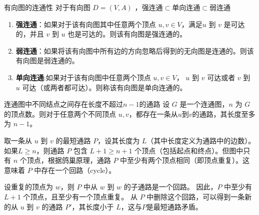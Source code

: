 \documentclass[lang=cn,11pt]{elegantbook}
\begin{document}
\begin{definition}{有向图的连通性}
对于有向图 $D = (V, A)$ ，$\text{强连通} \subset \text{单向连通} \subset \text{弱连通}$
\begin{enumerate}
    \item \textbf{强连通}：如果对于该有向图其中任意两个顶点 $u, v \in V$，满足$u$ 到 $v$ 是可达的，并且 $v$ 到 $u$ 也是可达的。则该有向图是强连通的。
\item\textbf{弱连通}：如果将该有向图中所有边的方向忽略后得到的无向图是连通的。则该有向图是弱连通的。
\item\textbf{单向连通}:如果对于该有向图中任意两个顶点 $u, v \in V$， $u$ 到 $v$ 可达或者 $v$ 到 $u$ 可达（或两者都可达）。则称该有向图是单向连通的。
\end{enumerate}
\end{definition}
\begin{theorem}{连通图中不同结点之间存在长度不超过$n-1$的通路}
    设 $G$ 是一个连通图，$n$ 为 $G$ 的顶点数。则对于任意两个不同顶点 $u, v$，都存在一条从$u$到$v$的通路，其长度至多为 $n-1$。
\end{theorem}
    取一条从 $u$ 到 $v$ 的最短通路 $P$，设其长度为 $L$（其中长度定义为通路中的边数）。
    如果$L\geqslant n$，则通路 $P$ 包含 $L+1\geqslant n+1$ 个顶点（包括起点和终点）。但图中只有 $n$ 个顶点，根据鸽巢原理，通路 $P$ 中至少有两个顶点相同（即顶点重复）。这意味着 $P$ 中存在一个回路（cycle）。
    
    设重复的顶点为 $w$，则 $P$ 中从 $w$ 到 $w$ 的子通路是一个回路。
    因此，$P$ 中至少有 $L+1$ 个顶点，且至少有一个顶点重复。
    从 $P$ 中删除这个回路，可以得到一条新的从 $u$ 到 $v$ 的通路 $P'$，其长度小于 $L$，这与$P$是最短通路矛盾。
    
\end{document}
